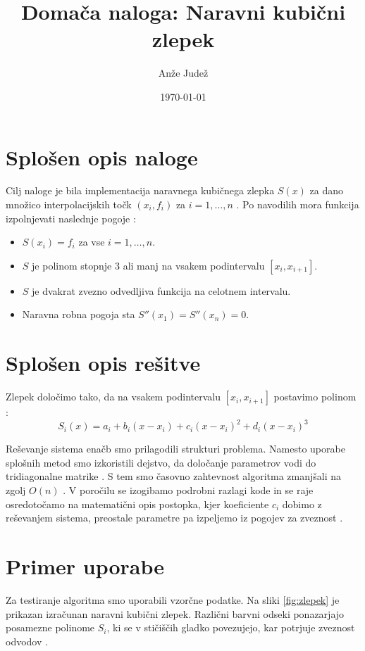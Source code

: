 \documentclass[11pt, a4paper]{article}
\title{Domača naloga: Naravni kubični zlepek}
\author{Anže Judež}
\date{\today}
\begin{document}
\maketitle

\section{Splošen opis naloge}
Cilj naloge je bila implementacija naravnega kubičnega zlepka $S(x)$ za dano množico interpolacijskih točk $(x_i, f_i)$ za $i = 1, \dots, n$ \cite{textbook}. Po navodilih mora funkcija izpolnjevati naslednje pogoje \cite{textbook}:
\begin{itemize}
    \item $S(x_i) = f_i$ za vse $i = 1, \dots, n$.
    \item $S$ je polinom stopnje 3 ali manj na vsakem podintervalu $[x_i, x_{i+1}]$.
    \item $S$ je dvakrat zvezno odvedljiva funkcija na celotnem intervalu.
    \item Naravna robna pogoja sta $S''(x_1) = S''(x_n) = 0$.
\end{itemize}

\section{Splošen opis rešitve}
Zlepek določimo tako, da na vsakem podintervalu $[x_i, x_{i+1}]$ postavimo polinom \cite{textbook}:
\[ S_i(x) = a_i + b_i(x - x_i) + c_i(x - x_i)^2 + d_i(x - x_i)^3 \]

Reševanje sistema enačb smo prilagodili strukturi problema. Namesto uporabe splošnih metod smo izkoristili dejstvo, da določanje parametrov vodi do tridiagonalne matrike \cite{textbook}. S tem smo časovno zahtevnost algoritma zmanjšali na zgolj $O(n)$ \cite{textbook}. V poročilu se izogibamo podrobni razlagi kode in se raje osredotočamo na matematični opis postopka, kjer koeficiente $c_i$ dobimo z reševanjem sistema, preostale parametre pa izpeljemo iz pogojev za zveznost \cite{textbook}.

\section{Primer uporabe}
Za testiranje algoritma smo uporabili vzorčne podatke. Na sliki \ref{fig:zlepek} je prikazan izračunan naravni kubični zlepek. Različni barvni odseki ponazarjajo posamezne polinome $S_i$, ki se v stičiščih gladko povezujejo, kar potrjuje zveznost odvodov \cite{textbook}.
\end{document}
